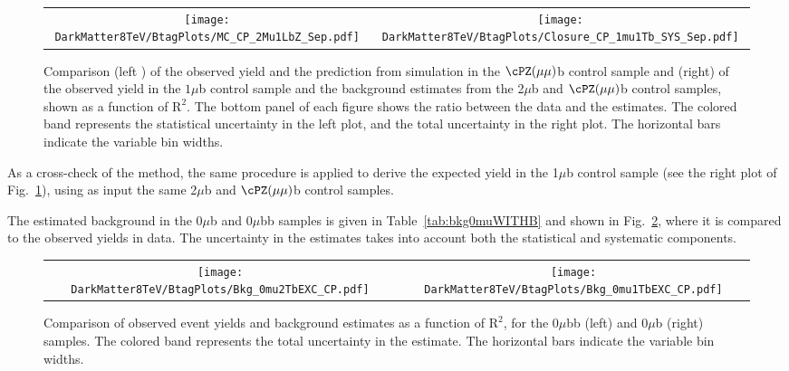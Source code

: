 {{{\begin{figure}[h!]
  \centering
  \begin{tabular}{cc}
   \texttt{[image: DarkMatter8TeV/BtagPlots/MC\_CP\_2Mu1LbZ\_Sep.pdf]}  & 
   \texttt{[image: DarkMatter8TeV/BtagPlots/Closure\_CP\_1mu1Tb\_SYS\_Sep.pdf]} \\
 \end{tabular}
 \caption{Comparison (left ) of the observed yield and the
   prediction from simulation in the $\cPZ(\mu\mu)$b control sample
   and (right) of the observed yield in the $1\mu$b control sample and
   the background estimates from the 2$\mu$b and $\cPZ(\mu\mu)$b
   control samples, shown as a function of $\mathrm{R^2}$. The bottom
   panel of each figure shows the ratio between the data and the
   estimates. The colored band represents the statistical uncertainty
   in the left plot, and the total uncertainty in the right plot. The horizontal bars indicate 
the variable bin widths.\label{fig:Zmumub}}
\end{figure}

As a cross-check of the method, the same
procedure is applied to derive the expected yield in the 1$\mu$b
control sample (see the right plot of Fig.~\ref{fig:Zmumub}), using as input the same 2$\mu$b and $\cPZ(\mu\mu)$b
control samples. 

The estimated background in the 0$\mu$b and 0$\mu$bb
samples is given in Table~\ref{tab:bkg0muWITHB} and shown in Fig.~\ref{fig:0muttbar}, where it is compared to
the observed yields in data. The uncertainty in the 
estimates takes into account both the statistical and systematic
components.%

\begin{figure}[h!]
 \centering
 \begin{tabular}{cc}
   \texttt{[image: DarkMatter8TeV/BtagPlots/Bkg\_0mu2TbEXC\_CP.pdf]} & 
   \texttt{[image: DarkMatter8TeV/BtagPlots/Bkg\_0mu1TbEXC\_CP.pdf]}\\
 \end{tabular}
 \caption{Comparison of observed event yields and background
   estimates as a function of $\mathrm{R^2}$, for the
   $0\mu$bb (left) and $0\mu$b (right) samples. The colored band
   represents the total uncertainty in the estimate. The horizontal bars indicate 
the variable bin widths.\label{fig:0muttbar}}
\end{figure}

}}}
